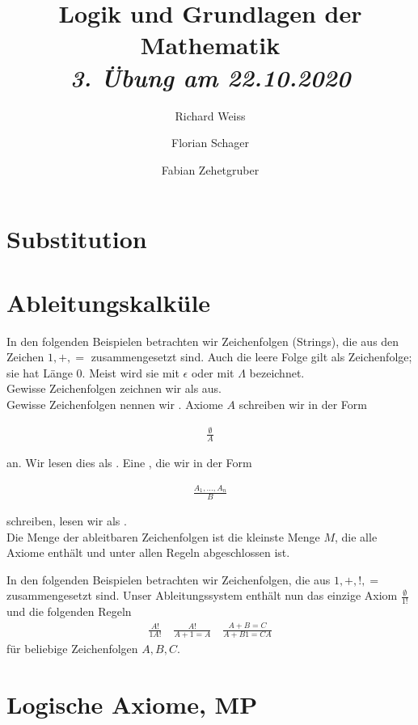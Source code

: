 \documentclass{article}
\title
{
  Logik und Grundlagen der Mathematik \\
  \vspace{4pt}
  \normalsize
  \textit{3. Übung am 22.10.2020}
}
\author
{
  Richard Weiss
  \and
  Florian Schager
  \and
  Fabian Zehetgruber
}
\date{}
\begin{document}
\maketitle

\section*{Substitution}




\section*{Ableitungskalküle}

In den folgenden Beispielen betrachten wir Zeichenfolgen (Strings), die aus
den Zeichen $1,+,=$ zusammengesetzt sind. Auch die leere Folge gilt als
Zeichenfolge; sie hat Länge $0$. Meist wird sie mit $\epsilon$ oder mit $\Lambda$
bezeichnet. \\
Gewisse Zeichenfolgen zeichnen wir als  aus. \\
Gewisse Zeichenfolgen nennen wir . Axiome $A$ schreiben wir in
der Form

\begin{align*}
  \frac{\emptyset}{A}
\end{align*}

an. Wir lesen dies als . Eine , die wir in
der Form

\begin{align*}
  \frac{A_1,\dots,A_n}{B}
\end{align*}

schreiben, lesen wir als . \\
Die Menge der ableitbaren Zeichenfolgen ist die kleinste Menge $M$, die alle
Axiome enthält und unter allen Regeln abgeschlossen ist.



In den folgenden Beispielen betrachten wir Zeichenfolgen, die aus $1,+,!,=$
zusammengesetzt sind. Unser Ableitungssystem enthält nun das einzige Axiom
$\frac{\emptyset}{1!}$ und die folgenden Regeln
\begin{align*}
  \frac{A!}{1A!} \quad \frac{A!}{A + 1 = A} \quad \frac{A + B = C}{A + B1 = CA}
\end{align*}
für beliebige Zeichenfolgen $A,B,C$.




\section*{Logische Axiome, MP}

\end{document}
